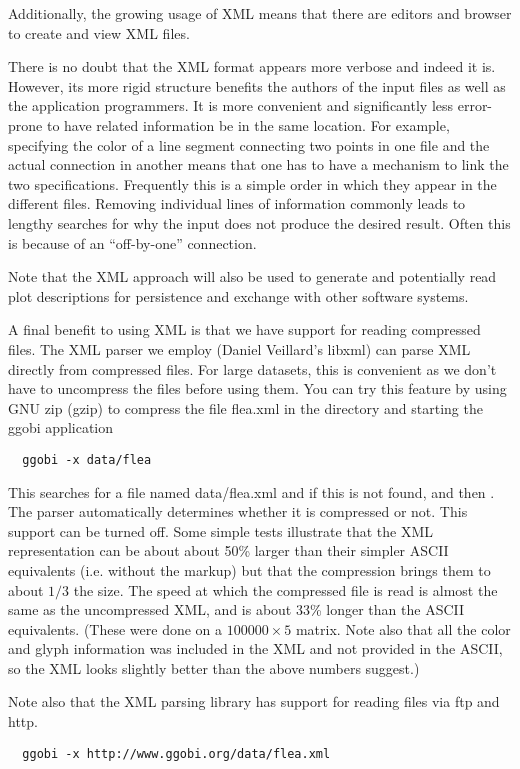 \documentclass{article}
\def\directory#1{\dir{#1}}
\def\file#1{\Escape{#1}}
\begin{document}
Additionally, the growing usage of XML means that there are editors
and browser to create and view XML files.

There is no doubt that the XML format appears more verbose and indeed
it is. However, its more rigid structure benefits the authors of the
input files as well as the application programmers.  It is more
convenient and significantly less error-prone to have related
information be in the same location.  For example, specifying the
color of a line segment connecting two points in one file and the
actual connection in another means that one has to have a mechanism to
link the two specifications. Frequently this is a simple order in
which they appear in the different files.  Removing individual lines
of information commonly leads to lengthy searches for why the input
does not produce the desired result.  Often this is because of an
``off-by-one'' connection.


Note that the XML approach will also be used to generate and
potentially read plot descriptions for persistence and exchange with
other software systems.


A final benefit to using XML is that we have support for reading
compressed files.  The XML parser we employ (Daniel Veillard's libxml)
can parse XML directly from compressed files.  For large datasets,
this is convenient as we don't have to uncompress the files before
using them.  You can try this feature by using GNU zip (gzip)
to compress the file flea.xml in the \directory{data}
directory and starting the ggobi application
\begin{verbatim}
  ggobi -x data/flea
\end{verbatim}
This searches for a file named data/flea.xml and if this is not found,
\file{data/flea.xml.gz} and then \file{data/flea.xmlz}.  The parser
automatically determines whether it is compressed or not.  This
support can be turned off.  Some simple tests illustrate that the XML
representation can be about about 50\% larger than their simpler ASCII
equivalents (i.e. without the markup) but that the compression brings
them to about $1/3$ the size. The speed at which the compressed file
is read is almost the same as the uncompressed XML, and is about 33\%
longer than the ASCII equivalents. (These were done on a $100000
\times 5$ matrix.  Note also that all the color and glyph information
was included in the XML and not provided in the ASCII, so the XML
looks slightly better than the above numbers suggest.)

Note also that the XML parsing library has support for reading files
via ftp and http.
\begin{verbatim}
  ggobi -x http://www.ggobi.org/data/flea.xml
\end{verbatim}
\end{document}
